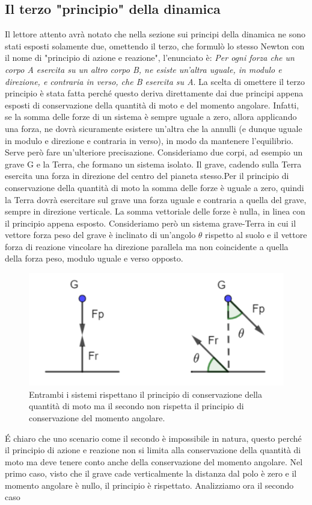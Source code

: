 \documentclass[10pt,a4paper]{article}
\begin{document}
\subsection{Il terzo "principio" della dinamica}
Il lettore attento avrà notato che nella sezione sui principi della dinamica ne sono stati esposti solamente due, omettendo il terzo, che formulò lo stesso Newton con il nome di "principio di azione e reazione", l'enunciato è: \textit{Per ogni forza che un corpo A esercita su un altro corpo B, ne esiste un'altra uguale, in modulo e direzione, e contraria in verso, che B esercita su A}. La scelta di omettere il terzo principio è stata fatta perché questo deriva direttamente dai due principi appena esposti di conservazione della quantità di moto e del momento angolare. Infatti, se la somma delle forze di un sistema è sempre uguale a zero, allora applicando una forza, ne dovrà sicuramente esistere un'altra che la annulli (e dunque uguale in modulo e direzione e contraria in verso), in modo da mantenere l'equilibrio. Serve però fare un'ulteriore precisazione. Consideriamo due corpi, ad esempio un grave G e la Terra, che formano un sistema isolato. Il grave, cadendo sulla Terra esercita una forza in direzione del centro del pianeta stesso.Per il principio di conservazione della quantità di moto la somma delle forze è uguale a zero, quindi la Terra dovrà esercitare sul grave una forza uguale e contraria a quella del grave, sempre in direzione verticale. La somma vettoriale delle forze è nulla, in linea con il principio appena esposto. Consideriamo però un sistema grave-Terra in cui il vettore forza peso del grave è inclinato di un'angolo $\theta$ rispetto al suolo e il vettore forza di reazione vincolare ha direzione parallela ma non coincidente a quella della forza peso, modulo uguale e verso opposto.
\begin{figure}[h]
	\centering
	\includegraphics[width=0.5\linewidth]{"Screenshot 2021-11-12 215042"}
	\caption{Entrambi i sistemi rispettano il principio di conservazione della quantità di moto ma il secondo non rispetta il principio di conservazione del momento angolare.}
	\label{fig:screenshot-2021-11-12-215042}
\end{figure}
\'{E} chiaro che uno scenario come il secondo è impossibile in natura, questo perché il principio di azione e reazione non si limita alla conservazione della quantità di moto ma deve tenere conto anche della conservazione del momento angolare. Nel primo caso, visto che il grave cade verticalmente la distanza dal polo è zero e il momento angolare è nullo, il principio è rispettato. Analizziamo ora il secondo caso
\end{document}
